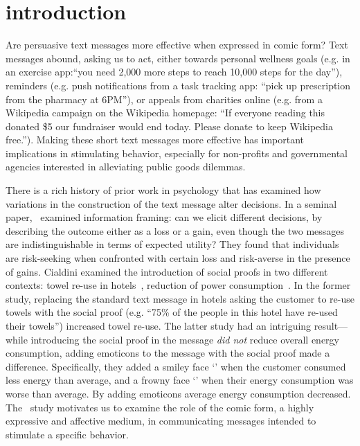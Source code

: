\section{introduction}
\label{sec:introduction}
Are persuasive text messages more effective when expressed in comic form? Text messages abound, asking us to act, either towards personal wellness goals (e.g. in an exercise app:``you need 2,000 more steps to reach 10,000 steps for the day''), reminders (e.g. push notifications from a task tracking app: ``pick up prescription from the pharmacy at 6PM''), or appeals from charities online (e.g. from a Wikipedia campaign on the Wikipedia homepage: ``If everyone reading this donated \$5 our fundraiser would end today. Please donate to keep Wikipedia free.''). Making these short text messages more effective has important implications in stimulating behavior, especially for non-profits and governmental agencies interested in alleviating public goods dilemmas.

There is a rich history of prior work in psychology that has examined how variations in the construction of the text message alter decisions. In a seminal paper,~\textcite{tversky1981framing} examined information framing: can we elicit different decisions, by describing the outcome either as a loss or a gain, even though the two messages are indistinguishable in terms of expected utility? They found that individuals are risk-seeking when confronted with certain loss and risk-averse in the presence of gains. Cialdini examined the introduction of social proofs in two different contexts: towel re-use in hotels~\parencite{goldstein2008room}, reduction of power consumption~\parencite{schultz2007constructive}. In the former study, replacing the standard text message in hotels asking the customer to re-use towels with the social proof (e.g. ``75\% of the people in this hotel have re-used their towels'') increased towel re-use. The latter study had an intriguing result---while introducing the social proof in the message \textit{did not} reduce overall energy consumption, adding emoticons to the message with the social proof made a difference. Specifically, they added a smiley face `\smiley{}' when the customer consumed less energy than average, and a frowny face `\frownie{}' when their energy consumption was worse than average. By adding emoticons average energy consumption decreased. The~\textcite{schultz2007constructive} study motivates us to examine the role of the comic form, a highly expressive and affective medium, in communicating messages intended to stimulate a specific behavior.

